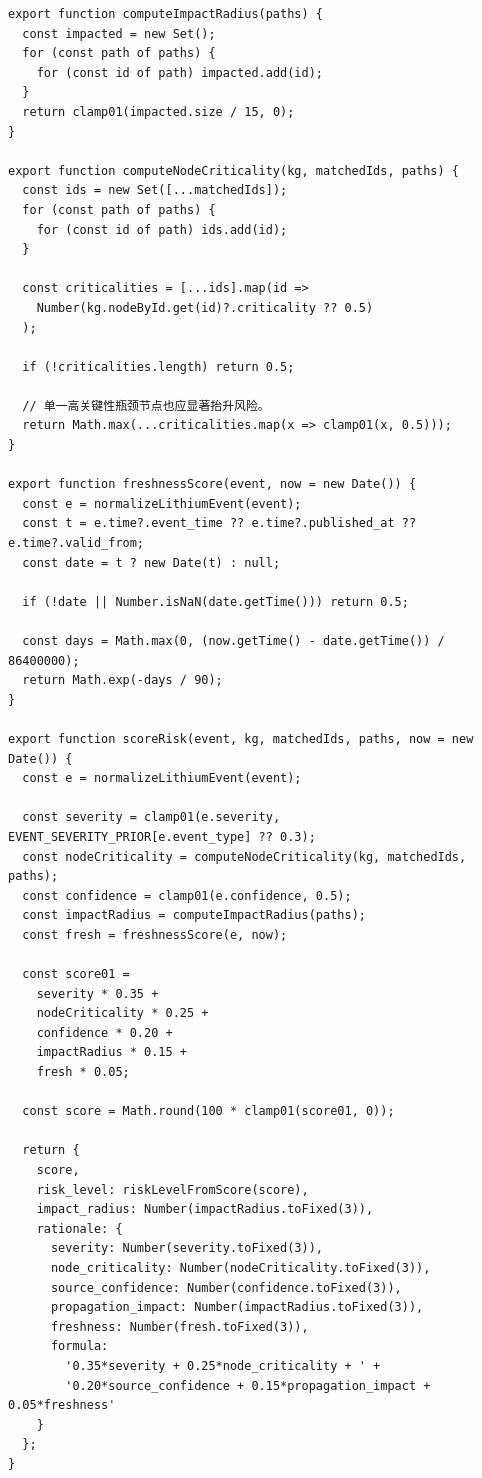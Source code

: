 \documentclass[12pt,a4paper]{article}
\begin{document}
\begin{lstlisting}[style=projectcode,caption={图增强可解释风险评分实现}]
export function computeImpactRadius(paths) {
  const impacted = new Set();
  for (const path of paths) {
    for (const id of path) impacted.add(id);
  }
  return clamp01(impacted.size / 15, 0);
}

export function computeNodeCriticality(kg, matchedIds, paths) {
  const ids = new Set([...matchedIds]);
  for (const path of paths) {
    for (const id of path) ids.add(id);
  }

  const criticalities = [...ids].map(id =>
    Number(kg.nodeById.get(id)?.criticality ?? 0.5)
  );

  if (!criticalities.length) return 0.5;

  // 单一高关键性瓶颈节点也应显著抬升风险。
  return Math.max(...criticalities.map(x => clamp01(x, 0.5)));
}

export function freshnessScore(event, now = new Date()) {
  const e = normalizeLithiumEvent(event);
  const t = e.time?.event_time ?? e.time?.published_at ?? e.time?.valid_from;
  const date = t ? new Date(t) : null;

  if (!date || Number.isNaN(date.getTime())) return 0.5;

  const days = Math.max(0, (now.getTime() - date.getTime()) / 86400000);
  return Math.exp(-days / 90);
}

export function scoreRisk(event, kg, matchedIds, paths, now = new Date()) {
  const e = normalizeLithiumEvent(event);

  const severity = clamp01(e.severity, EVENT_SEVERITY_PRIOR[e.event_type] ?? 0.3);
  const nodeCriticality = computeNodeCriticality(kg, matchedIds, paths);
  const confidence = clamp01(e.confidence, 0.5);
  const impactRadius = computeImpactRadius(paths);
  const fresh = freshnessScore(e, now);

  const score01 =
    severity * 0.35 +
    nodeCriticality * 0.25 +
    confidence * 0.20 +
    impactRadius * 0.15 +
    fresh * 0.05;

  const score = Math.round(100 * clamp01(score01, 0));

  return {
    score,
    risk_level: riskLevelFromScore(score),
    impact_radius: Number(impactRadius.toFixed(3)),
    rationale: {
      severity: Number(severity.toFixed(3)),
      node_criticality: Number(nodeCriticality.toFixed(3)),
      source_confidence: Number(confidence.toFixed(3)),
      propagation_impact: Number(impactRadius.toFixed(3)),
      freshness: Number(fresh.toFixed(3)),
      formula:
        '0.35*severity + 0.25*node_criticality + ' +
        '0.20*source_confidence + 0.15*propagation_impact + 0.05*freshness'
    }
  };
}


\end{lstlisting}
\end{document}
